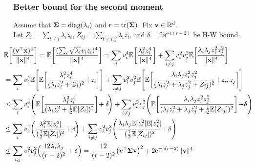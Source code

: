 \documentclass[10pt]{beamer}
\begin{document}
\begin{frame}
  \frametitle{Better bound for the second moment}
Assume that $\mathbf{\Sigma}=\operatorname*{\mathop{\mathrm{diag}}}(\lambda_{i})$ and $r=\mathrm{tr}(\mathbf{\Sigma})$. Fix
$\mathbf v\in\mathbb R^d$.\\
Let $Z_i=\sum_{t\neq i}\lambda_tz_t$, $Z_{ij}=\sum_{t\neq
  i,j}\lambda_tz_t$, and $\delta = 2\ee^{-c(r-2)}$ be H-W bound.
\begin{align*}
\hspace{-8mm}  
&\E\bigg[\frac{(\v^\top\x)^4}{\|\x\|^4}\bigg] =
    \E\bigg[\frac{(\sum_i \sqrt{\lambda_i}v_iz_i)^4}{\|\x\|^4}\bigg]
  = \sum_iv_i^4
\E\bigg[\frac{\lambda_i^2z_i^4}{\|\x\|^4}\bigg]+
    \sum_{i\neq
    j}v_i^2v_j^2\E\bigg[\frac{\lambda_i\lambda_jz_i^2z_j^2}{\|\x\|^4}\bigg]\\
\hspace{-8mm}  &=  \sum_iv_i^4
    \E\Bigg[\E\bigg[\frac{\lambda_i^2z_i^4}{(\lambda_iz_i^2+Z_i)^2}\mid z_i\bigg]\Bigg] +
\sum_{i\neq j}v_i^2v_j^2
\E\Bigg[\E\bigg[\frac{\lambda_i\lambda_jz_i^2z_j^2}
{(\lambda_iz_i^2+\lambda_jz_j^2+Z_{ij})^2}\mid 
    z_i,z_j\bigg]\Bigg]\\
\hspace{-8mm}    &\leq  \sum_iv_i^4
\Bigg(\E\bigg[\frac{\lambda_i^2z_i^4}{(\lambda_iz_i^2+\frac12\E[Z_i])^2}\bigg] \!+ \delta\!\Bigg) +
    \sum_{i\neq
    j}v_i^2v_j^2\Bigg(\E\bigg[\frac{\lambda_i\lambda_jz_i^2z_j^2}{(\lambda_iz_i^2+\lambda_jz_j^2+\frac12\E[Z_{ij}])^2}\bigg]
                   \!+\!\delta\Bigg)\\
  \hspace{-8mm}
  &\leq \sum_iv_i^4
\bigg(\frac{\lambda_i^2\E[z_i^4]}{(\frac12\E[Z_i])^2} \!+ \delta\!\bigg) +
    \sum_{i\neq j}v_i^2v_j^2
    \Bigg(\frac{\lambda_i\lambda_j\E[z_i^2]\E[z_j^2]}{(\frac12\E[Z_{ij}])^2}
    \!+\!\delta\Bigg)\\
  \hspace{-8mm}
  &\leq \sum_{i,j}v_i^2v_j^2\Big(\frac{12\lambda_i\lambda_j}{(r-2)^2}
    + \delta\Big) = \frac{12}{(r-2)^2}\big(\v^\top\Sigmab\v\big)^2 + 2\ee^{-c(r-2)}\|\v\|^4
\end{align*}
\end{frame}
\end{document}
